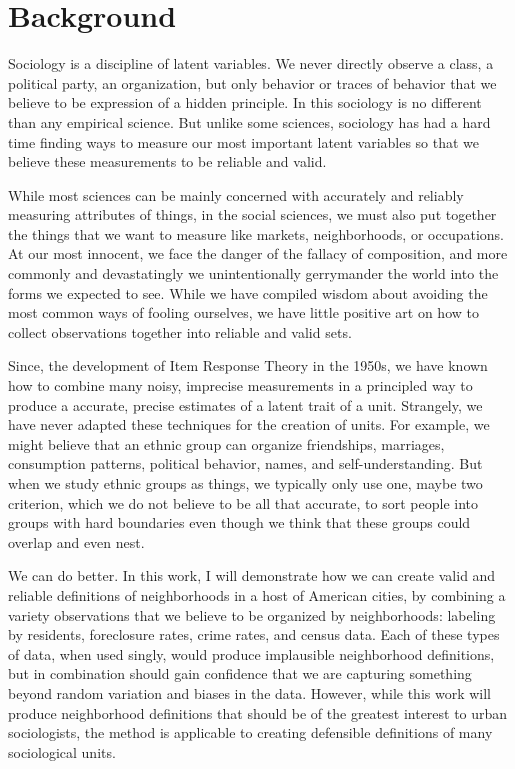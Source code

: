 \documentclass{article}
\begin{document}
\section{Background}
Sociology is a discipline of latent variables. We never directly
observe a class, a political party, an organization, but only behavior
or traces of behavior that we believe to be expression of a hidden
principle. In this sociology is no different than any empirical
science. But unlike some sciences, sociology has had a hard time
finding ways to measure our most important latent variables so
that we believe these measurements to be reliable and valid.

While most sciences can be mainly concerned with accurately and
reliably measuring attributes of things, in the social sciences, we
must also put together the things that we want to measure like
markets, neighborhoods, or occupations. At our most innocent, we
face the danger of the fallacy of composition, and more commonly and
devastatingly we unintentionally gerrymander the world into the forms
we expected to see. While we have compiled wisdom about avoiding the
most common ways of fooling ourselves, we have little positive art on
how to collect observations together into reliable and valid sets.

Since, the development of Item Response Theory in the 1950s, we have
known how to combine many noisy, imprecise measurements in a
principled way to produce a accurate, precise estimates of a latent
trait of a unit. Strangely, we have never adapted these techniques for
the creation of units. For example, we might believe that an ethnic
group can organize friendships, marriages, consumption patterns,
political behavior, names, and self-understanding. But when we study
ethnic groups as things, we typically only use one, maybe two
criterion, which we do not believe to be all that accurate, to sort
people into groups with hard boundaries even though we think that
these groups could overlap and even nest.

We can do better. In this work, I will demonstrate how we can create
valid and reliable definitions of neighborhoods in a host of American
cities, by combining a variety observations that we believe to be
organized by neighborhoods: labeling by residents, foreclosure rates,
crime rates, and census data. Each of these types of data, when used
singly, would produce implausible neighborhood definitions, but in
combination should gain confidence that we are capturing something
beyond random variation and biases in the data. However, while this
work will produce neighborhood definitions that should be of the
greatest interest to urban sociologists, the method is applicable to
creating defensible definitions of many sociological units.
\end{document}
